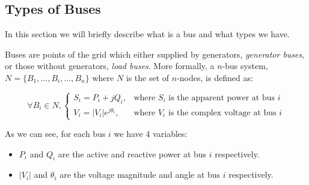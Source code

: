 \documentclass[a4paper,11pt, titlepage, twoside]{article}
\begin{document}
\subsection{Types of Buses}

In this section we will briefly describe what is a bus and what types we have.\par
Buses are points of the grid which either supplied by generators, \textit{generator buses}, or those without generators, \textit{load buses}. More formally, a $n$-bus system, $N=\{B_1,...,B_i,...,B_n\}$ where $N$ is the set of $n$-nodes, is defined as:

\begin{equation}
    \forall B_i \in N,
    \begin{cases}
        S_i = P_i + jQ_i, & \text{where } S_i \text{ is the apparent power at bus } i \\
        V_i = |V_i|e^{j\theta_i}, & \text{where } V_i \text{ is the complex voltage at bus } i
    \end{cases}
\end{equation}

As we can see, for each bus $i$ we have 4 variables:

\begin{itemize}
    \item $P_i$ and $Q_i$ are the active and reactive power at bus $i$ respectively.
    \item $|V_i|$ and $\theta_i$ are the voltage magnitude and angle at bus $i$ respectively.
\end{itemize}
\end{document}
